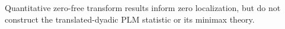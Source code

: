 Quantitative zero-free transform results inform zero localization, but do not construct the translated-dyadic PLM statistic or its minimax theory.